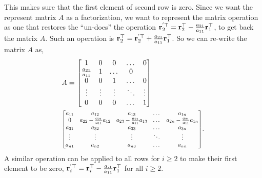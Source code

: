 \documentclass[twocolumn]{article}
\begin{document}
This makes  sure   that  the  first element  of   second   row is zero.  Since
we  want  the    represent   matrix $A$   as a    factorization, we want to
represent the  matrix  operation as one   that   restores  the  ``un-does'' the
operation   $\mathbf{r}_2^{'\top}=\mathbf{r}_2^\top - \frac{a_{21}}{a_{11}}\mathbf{r}_1^\top$, to
get back  the  matrix $A$. Such
an  operation is  $\mathbf{r}_2^\top  =\mathbf{r}_2^{'\top}+
\frac{a_{21}}{a_{11}}\mathbf{r}_1^\top$.  So we  can  re-write the matrix  $A$ as,
%
\begin{align*}
  &A=\begin{bmatrix} 1  & 0  &  0 &  \dots  & 0 \\
    \frac{a_{21}}{a_{11}} & 1  & \dots  &   0  \\
    0 & 0  & 1 & \dots  &   0  \\
    \vdots  & \vdots &  \vdots  &   \ddots  &  \vdots   \\
    0 & 0 &  0   &  \dots  & 1
  \end{bmatrix}  \\
  &  \scalebox{0.8}{\mbox{$\begin{bmatrix}
        a_{11} & a_{12}  &  a_{13} &     \dots &  a_{1n} \\
        0 & a_{22}-\frac{a_{21}}{a_{11}}a_{12}  & a_{23}-\frac{a_{21}}{a_{11}}a_{13} &  \dots &  a_{2n} -\frac{a_{21}}{a_{11}}a_{1n}\\
        a_{31} & a_{32}  &  a_{33} &     \dots &  a_{3n} \\
        \vdots &  \vdots  & \vdots &  \ddots & \vdots \\
        a_{n1} & a_{n2}  &  a_{n3} &   \dots &  a_{nn}
      \end{bmatrix}$}}.
\end{align*}
%
A  similar  operation  can  be applied to  all rows for  $i \ge 2$ to make  their first element
to  be zero, $\mathbf{r}_i^{'\top} =  \mathbf{r}_i^\top  -\frac{a_{i1}}{a_{11}} \mathbf{r}_1^\top$
for all $i \ge 2$.
% 
\end{document}
